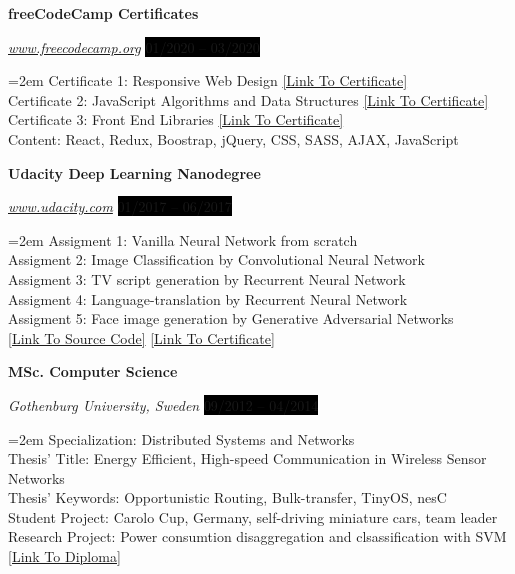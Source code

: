 \documentclass[paper=a4,fontsize=11pt]{scrartcl}	 			%
\newcommand{\EducationEntry}[4]{
		\noindent \textbf{#1} \par 					%
		\noindent \textit{#3} \hfill				%
		\colorbox{Black}{%
			\hfill\color{White}#2} \par				%
		\noindent\hangindent=2em\hangafter=0 \small #4 	%
		\normalsize \par
    }
\begin{document}
\EducationEntry{freeCodeCamp Certificates}{01/2020 -- 03/2020}
{\href{https://www.freecodecamp.org}{www.freecodecamp.org}}
{Certificate 1: Responsive Web Design
\href{https://www.freecodecamp.org/certification/fcc7d8027bd-7ee4-4ec3-816b-87c5087dab3c/responsive-web-design}{[Link To Certificate]}
\\
Certificate 2: JavaScript Algorithms and Data Structures
\href{https://www.freecodecamp.org/certification/fcc7d8027bd-7ee4-4ec3-816b-87c5087dab3c/javascript-algorithms-and-data-structures}{[Link To Certificate]}
\\
Certificate 3: Front End Libraries
\href{https://www.freecodecamp.org/certification/fcc7d8027bd-7ee4-4ec3-816b-87c5087dab3c/front-end-libraries}{[Link To Certificate]}
\\
Content: React, Redux, Boostrap, jQuery, CSS, SASS, AJAX, JavaScript
}

\EducationEntry{Udacity Deep Learning Nanodegree}{01/2017 -- 06/2017}
{\href{https://www.udacity.com}{www.udacity.com}} {Assigment 1: Vanilla Neural Network from scratch\\
 Assigment 2: Image Classification by Convolutional Neural Network\\
 Assigment 3: TV script generation by Recurrent Neural Network\\
 Assigment 4: Language-translation by Recurrent Neural Network\\
 Assigment 5: Face image generation by Generative Adversarial Networks \\
 \href{https://github.com/NagyAttila/Udacity_DLND_Assigments } {[Link To Source Code]}
 \href{https://github.com/NagyAttila/CV/blob/59391275197eb3badbd4f8f62faa413d1bc8eb0d/certificates/2017_Udacity_DLND.pdf} {[Link To Certificate]}
}

\EducationEntry{MSc. Computer Science}{09/2012 -- 04/2014}
  {Gothenburg University, Sweden}{Specialization: Distributed Systems and Networks\\
  Thesis' Title: Energy Efficient, High-speed Communication in Wireless Sensor Networks\\
  Thesis' Keywords: Opportunistic Routing, Bulk-transfer, TinyOS, nesC\\
  Student Project: Carolo Cup, Germany, self-driving miniature cars, team leader\\
  Research Project: Power consumtion disaggregation and clsassification with SVM \\
 \href{https://github.com/NagyAttila/CV/blob/59391275197eb3badbd4f8f62faa413d1bc8eb0d/certificates/2014_MSC.zip}
 {[Link To Diploma]}
}
\end{document}
